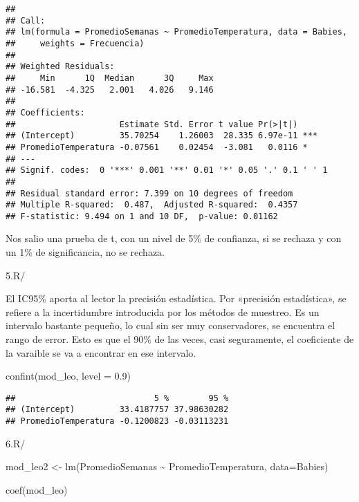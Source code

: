 \documentclass[
]{article}
\newenvironment{Shaded}{\begin{snugshade}}{\end{snugshade}}
\newcommand{\AttributeTok}[1]{\textcolor[rgb]{0.77,0.63,0.00}{#1}}
\newcommand{\FloatTok}[1]{\textcolor[rgb]{0.00,0.00,0.81}{#1}}
\newcommand{\FunctionTok}[1]{\textcolor[rgb]{0.00,0.00,0.00}{#1}}
\newcommand{\NormalTok}[1]{#1}
\newcommand{\OtherTok}[1]{\textcolor[rgb]{0.56,0.35,0.01}{#1}}
\newcommand{\SpecialCharTok}[1]{\textcolor[rgb]{0.00,0.00,0.00}{#1}}
\begin{document}
\begin{verbatim}
## 
## Call:
## lm(formula = PromedioSemanas ~ PromedioTemperatura, data = Babies, 
##     weights = Frecuencia)
## 
## Weighted Residuals:
##     Min      1Q  Median      3Q     Max 
## -16.581  -4.325   2.001   4.026   9.146 
## 
## Coefficients:
##                     Estimate Std. Error t value Pr(>|t|)    
## (Intercept)         35.70254    1.26003  28.335 6.97e-11 ***
## PromedioTemperatura -0.07561    0.02454  -3.081   0.0116 *  
## ---
## Signif. codes:  0 '***' 0.001 '**' 0.01 '*' 0.05 '.' 0.1 ' ' 1
## 
## Residual standard error: 7.399 on 10 degrees of freedom
## Multiple R-squared:  0.487,  Adjusted R-squared:  0.4357 
## F-statistic: 9.494 on 1 and 10 DF,  p-value: 0.01162
\end{verbatim}

Nos salio una prueba de t, con un nivel de 5\% de confianza, si se
rechaza y con un 1\% de significancia, no se rechaza.

5.R/

El IC95\% aporta al lector la precisión estadística. Por «precisión
estadística», se refiere a la incertidumbre introducida por los métodos
de muestreo. Es un intervalo bastante pequeño, lo cual sin ser muy
conservadores, se encuentra el rango de error. Esto es que el 90\% de
las veces, casi seguramente, el coeficiente de la varaible se va a
encontrar en ese intervalo.

\begin{Shaded}
\begin{Highlighting}[]
\FunctionTok{confint}\NormalTok{(mod\_leo, }\AttributeTok{level =} \FloatTok{0.9}\NormalTok{)}
\end{Highlighting}
\end{Shaded}

\begin{verbatim}
##                            5 %        95 %
## (Intercept)         33.4187757 37.98630282
## PromedioTemperatura -0.1200823 -0.03113231
\end{verbatim}

6.R/

\begin{Shaded}
\begin{Highlighting}[]
\NormalTok{mod\_leo2 }\OtherTok{\textless{}{-}}  \FunctionTok{lm}\NormalTok{(PromedioSemanas }\SpecialCharTok{\textasciitilde{}}\NormalTok{ PromedioTemperatura, }\AttributeTok{data=}\NormalTok{Babies)}

\FunctionTok{coef}\NormalTok{(mod\_leo)}
\end{Highlighting}
\end{Shaded}
\end{document}
